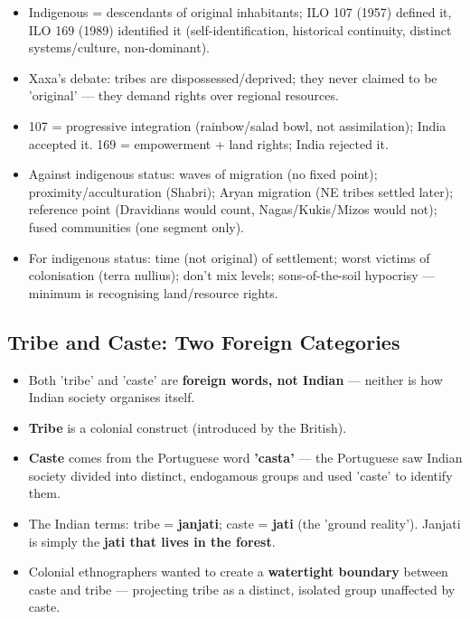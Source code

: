 \begin{QuickRevision}
\begin{itemize}
\item Indigenous = descendants of original inhabitants; ILO 107 (1957) defined it, ILO 169 (1989) identified it (self-identification, historical continuity, distinct systems/culture, non-dominant).
\item Xaxa's debate: tribes are dispossessed/deprived; they never claimed to be 'original' --- they demand rights over regional resources.
\item 107 = progressive integration (rainbow/salad bowl, not assimilation); India accepted it. 169 = empowerment + land rights; India rejected it.
\item Against indigenous status: waves of migration (no fixed point); proximity/acculturation (Shabri); Aryan migration (NE tribes settled later); reference point (Dravidians would count, Nagas/Kukis/Mizos would not); fused communities (one segment only).
\item For indigenous status: time (not original) of settlement; worst victims of colonisation (terra nullius); don't mix levels; sons-of-the-soil hypocrisy --- minimum is recognising land/resource rights.
\end{itemize}
\end{QuickRevision}

\subsection{Tribe and Caste: Two Foreign Categories}

\begin{KeyConcept}
\begin{itemize}
\item Both 'tribe' and 'caste' are \textbf{foreign words, not Indian} --- neither is how Indian society organises itself.
\item \textbf{Tribe} is a colonial construct (introduced by the British).
\item \textbf{Caste} comes from the Portuguese word \textbf{'casta'} --- the Portuguese saw Indian society divided into distinct, endogamous groups and used 'caste' to identify them.
\item The Indian terms: tribe = \textbf{janjati}; caste = \textbf{jati} (the 'ground reality'). Janjati is simply the \textbf{jati that lives in the forest}.
\item Colonial ethnographers wanted to create a \textbf{watertight boundary} between caste and tribe --- projecting tribe as a distinct, isolated group unaffected by caste.
\end{itemize}
\end{KeyConcept}

